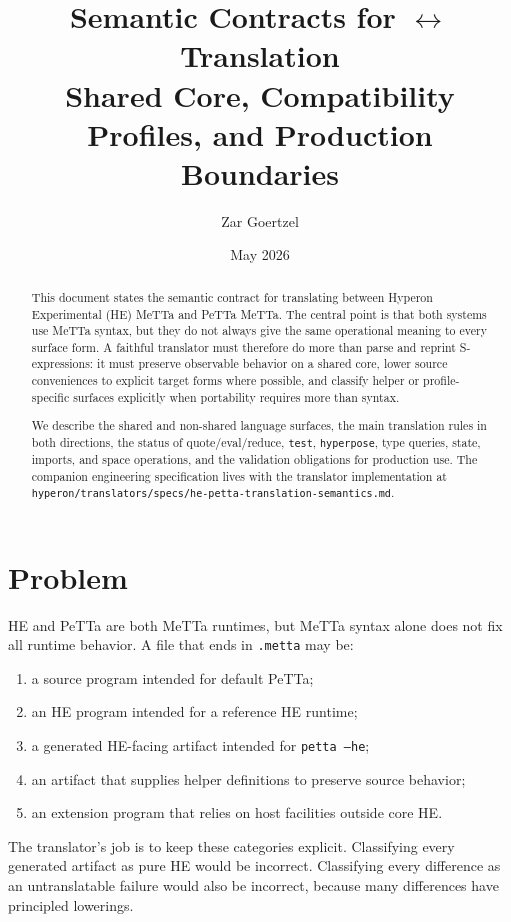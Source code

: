 \documentclass[11pt]{article}
\title{Semantic Contracts for \HE{} $\leftrightarrow$ \PeTTa{} Translation\\
\large Shared Core, Compatibility Profiles, and Production Boundaries}
\author{Zar Goertzel}
\date{May 2026}
\newcommand{\code}[1]{\texttt{#1}}
\newcommand{\HE}{\textup{HE}}
\newcommand{\PeTTa}{\textup{PeTTa}}
\begin{document}
\maketitle

\begin{abstract}
This document states the semantic contract for translating between Hyperon
Experimental (\HE{}) MeTTa and \PeTTa{} MeTTa.  The central point is that both
systems use MeTTa syntax, but they do not always give the same operational
meaning to every surface form.  A faithful translator must therefore do more
than parse and reprint S-expressions: it must preserve observable behavior on a
shared core, lower source conveniences to explicit target forms where possible,
and classify helper or profile-specific surfaces explicitly when portability
requires more than syntax.

We describe the shared and non-shared language surfaces, the main translation
rules in both directions, the status of quote/eval/reduce, \code{test},
\code{hyperpose}, type queries, state, imports, and space operations, and the
validation obligations for production use.  The companion engineering
specification lives with the translator implementation at
\code{hyperon/translators/specs/he-petta-translation-semantics.md}.
\end{abstract}

\tableofcontents

\section{Problem}

\HE{} and \PeTTa{} are both MeTTa runtimes, but MeTTa syntax alone does not fix
all runtime behavior.  A file that ends in \code{.metta} may be:
\begin{enumerate}
\item a source program intended for default \PeTTa{};
\item an \HE{} program intended for a reference \HE{} runtime;
\item a generated \HE{}-facing artifact intended for \code{petta --he};
\item an artifact that supplies helper definitions to preserve source behavior;
\item an extension program that relies on host facilities outside core \HE{}.
\end{enumerate}

The translator's job is to keep these categories explicit.  Classifying every
generated artifact as pure \HE{} would be incorrect.  Classifying every
difference as an untranslatable failure would also be incorrect, because many
differences have principled lowerings.
\end{document}
